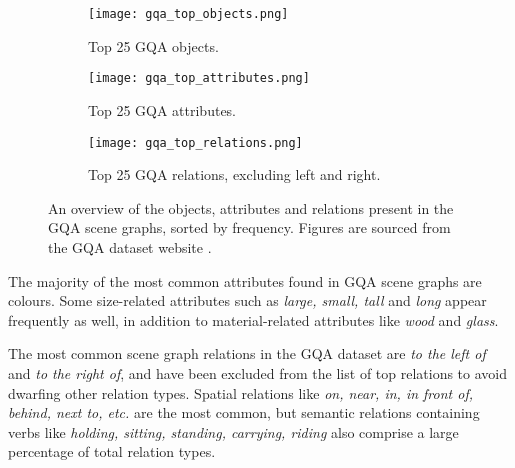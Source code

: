 \begin{figure}[htbp]
    \centering
    \begin{subfigure}[l]{0.49\textwidth}
        \texttt{[image: gqa\_top\_objects.png]}
        \label{fig:gqa_top_objects}
        \caption{Top 25 GQA objects.}
    \end{subfigure}
    \begin{subfigure}[r]{0.49\textwidth}
        \texttt{[image: gqa\_top\_attributes.png]}
        \label{fig:gqa_top_attributes}
        \caption{Top 25 GQA attributes.}
    \end{subfigure}
    \begin{subfigure}[b]{0.5\textwidth}
        \texttt{[image: gqa\_top\_relations.png]}
        \label{fig:gqa_top_relations}
        \caption{Top 25 GQA relations, excluding left and right.}
    \end{subfigure}
    \caption[An overview of GQA object, attribute and relation distributions.]{An overview of the objects, attributes and relations present in the GQA scene graphs, sorted by frequency. Figures are sourced from the GQA dataset website \cite{hudson2019gqa_website}.}
    \label{fig:gqa_scene_graph_object_relation_attribute_distribution}
\end{figure}

The majority of the most common attributes found in GQA scene graphs are colours. Some size-related attributes such as \textit{large, small, tall} and \textit{long} appear frequently as well, in addition to material-related attributes like \textit{wood} and \textit{glass}.

The most common scene graph relations in the GQA dataset are \textit{to the left of} and \textit{to the right of}, and have been excluded from the list of top relations to avoid dwarfing other relation types. Spatial relations like \textit{on, near, in, in front of, behind, next to, etc.} are the most common, but semantic relations containing verbs like \textit{holding, sitting, standing, carrying, riding} also comprise a large percentage of total relation types.

